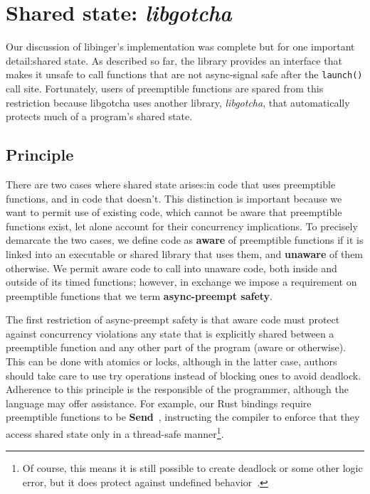 \section{Shared state: \textit{libgotcha}}
\label{sec:libgotcha}


Our discussion of libinger's implementation was complete but for one important
detail:\@ shared state.  As described so far, the library provides an interface that
makes it unsafe to call functions that are not async-signal safe after the
\texttt{launch()} call site.  Fortunately, users of preemptible functions are spared
from this
restriction because libgotcha uses another library, \textit{libgotcha}, that
automatically protects much of a program's shared state.

\subsection{Principle}

There are two cases where shared state arises:\@ in code that uses preemptible
functions, and in code that doesn't.  This distinction is important because we want
to permit use of existing code, which cannot be aware that preemptible functions
exist, let alone account for their concurrency implications.  To precisely demarcate
the two cases, we define code as \textbf{aware} of preemptible functions if it is
linked into an executable or shared library that uses them, and \textbf{unaware} of
them otherwise.  We permit aware code to call into unaware code, both inside and
outside of its timed functions; however, in exchange we impose a requirement on
preemptible functions that we term \textbf{async-preempt safety}.

The first restriction of async-preempt safety is that aware code must protect against
concurrency violations any state that is explicitly shared between a preemptible
function and any other part of the program (aware or otherwise).  This can be done
with atomics or locks, although in the latter case, authors should take care to use
try operations instead of blocking ones to avoid deadlock.  Adherence to this
principle is the responsible of the programmer, although the language may offer
assistance.  For example, our Rust bindings require preemptible functions to be
\textbf{Send}~\cite{www-rustlang-conc}, instructing the compiler to enforce that they
access shared state only in a thread-safe manner\footnote{Of course, this means it is
still possible to create deadlock or some other logic error, but it does protect
against undefined behavior~\cite{www-rustlang-nu}.}.

